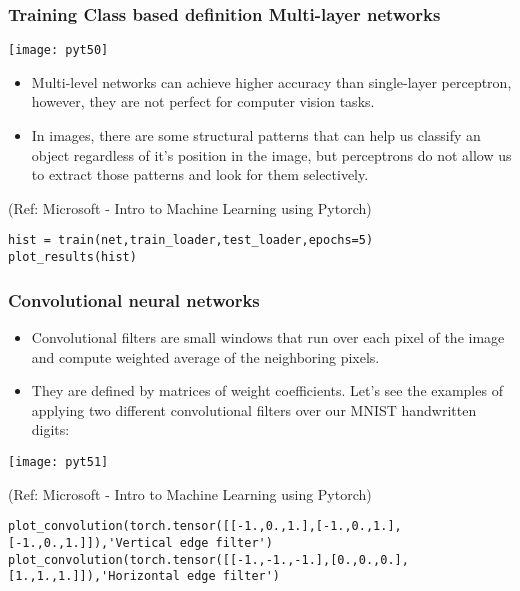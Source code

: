 \begin{frame}[fragile] \frametitle{Training Class based definition Multi-layer networks}


\begin{center}
\texttt{[image: pyt50]}
\end{center}


\begin{itemize}
\item Multi-level networks can achieve higher accuracy than single-layer perceptron, however, they are not perfect for computer vision tasks. 
\item In images, there are some structural patterns that can help us classify an object regardless of it's position in the image, but perceptrons do not allow us to extract those patterns and look for them selectively.
\end{itemize}

\tiny{(Ref: Microsoft - Intro to Machine Learning using Pytorch)}

\begin{lstlisting}
hist = train(net,train_loader,test_loader,epochs=5)
plot_results(hist)
\end{lstlisting}
\end{frame}

\begin{frame}[fragile] \frametitle{Convolutional neural networks}

\begin{itemize}
\item Convolutional filters are small windows that run over each pixel of the image and compute weighted average of the neighboring pixels.

\item They are defined by matrices of weight coefficients. Let's see the examples of applying two different convolutional filters over our MNIST handwritten digits:
\end{itemize}

\begin{center}
\texttt{[image: pyt51]}
\end{center}

\tiny{(Ref: Microsoft - Intro to Machine Learning using Pytorch)}

\begin{lstlisting}
plot_convolution(torch.tensor([[-1.,0.,1.],[-1.,0.,1.],[-1.,0.,1.]]),'Vertical edge filter')
plot_convolution(torch.tensor([[-1.,-1.,-1.],[0.,0.,0.],[1.,1.,1.]]),'Horizontal edge filter')

\end{lstlisting}


\end{frame}

